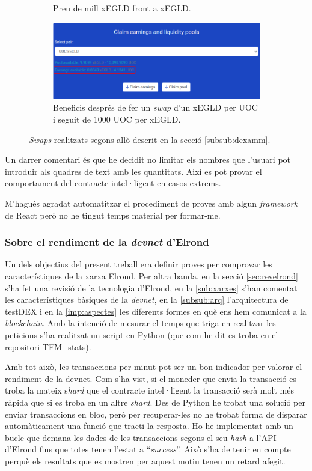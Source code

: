 \documentclass[11pt,a4paper]{article}
\begin{document}
\begin{figure}[!htb]
\begin{subfigure}[b]{0.47\textwidth}
	  \caption{Preu de mill xEGLD front a xEGLD.}\label{fig:imp-price3}
	\end{subfigure}\hfill
	\begin{subfigure}[b]{0.47\textwidth}
	  \includegraphics[width=\linewidth]{imp-price4.png}
	  \caption{Beneficis després de fer un \textit{swap} d'un xEGLD per UOC i seguit de 1000 UOC per xEGLD.}\label{fig:imp-price4}
	\end{subfigure}\hfill
	\caption{\textit{Swaps} realitzats segons allò descrit en la secció \ref{subsub:dexamm}.}
\end{figure}

Un darrer comentari és que he decidit no limitar els nombres que l'usuari pot introduir als quadres de text amb les quantitats. Així es pot provar el comportament del contracte intel·ligent en casos extrems.

M'hagués agradat automatitzar el procediment de proves amb algun \textit{framework} de React però no he tingut temps material per formar-me.

\subsubsection{Sobre el rendiment de la \textit{devnet} d'Elrond}
Un dels objectius del present treball era definir proves per comprovar les característiques de la xarxa Elrond. Per altra banda, en la secció \ref{sec:revelrond} s'ha fet una revisió de la tecnologia d'Elrond, en la \ref{sub:xarxes} s'han comentat les característiques bàsiques de la \textit{devnet}, en la \ref{subsub:arq} l'arquitectura de testDEX i en la \ref{imp:aspectes} les diferents formes en què ens hem comunicat a la \textit{blockchain}. Amb la intenció de mesurar el temps que triga en realitzar les peticions s'ha realitzat un script en Python (que com he dit es troba en el repositori TFM\_stats).

Amb tot això, les transaccions per minut pot ser un bon indicador per valorar el rendiment de la devnet. Com s'ha vist, si el moneder que envia la transacció es troba la mateix s\textit{hard} que el contracte intel·ligent la transacció serà molt més ràpida que si es troba en un altre \textit{shard}. Des de Python he trobat una solució per enviar transaccions en bloc, però per recuperar-les no he trobat forma de disparar automàticament una funció que tracti la resposta. Ho he implementat amb un bucle que demana les dades de les transaccions segons el seu \textit{hash} a l'API d'Elrond fins que totes tenen l'estat a ``\textit{success}''. Això s'ha de tenir en compte perquè els resultats que es mostren per aquest motiu tenen un retard afegit.
\end{document}

